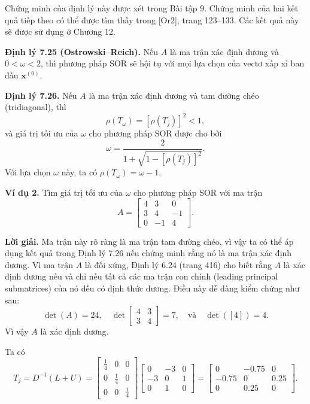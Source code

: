 Chứng minh của định lý này được xét trong Bài tập 9. 
Chứng minh của hai kết quả tiếp theo có thể được tìm thấy trong [Or2], trang 123–133. 
Các kết quả này sẽ được sử dụng ở Chương 12.

\textbf{Định lý 7.25 (Ostrowski–Reich).}  
Nếu \( A \) là ma trận xác định dương và \( 0 < \omega < 2 \), 
thì phương pháp SOR sẽ hội tụ với mọi lựa chọn của vectơ xấp xỉ ban đầu \( \mathbf{x}^{(0)} \).

\textbf{Định lý 7.26.}  
Nếu \( A \) là ma trận xác định dương và tam đường chéo (tridiagonal), thì 
\[
\rho(T_\omega) = [\rho(T_j)]^2 < 1,
\]
và giá trị tối ưu của \( \omega \) cho phương pháp SOR được cho bởi
\[
\omega = \frac{2}{1 + \sqrt{1 - [\rho(T_j)]^2}}.
\]
Với lựa chọn \( \omega \) này, ta có \( \rho(T_\omega) = \omega - 1. \)

\textbf{Ví dụ 2.}  
Tìm giá trị tối ưu của \( \omega \) cho phương pháp SOR với ma trận
\[
A = 
\begin{bmatrix}
4 & 3 & 0 \\
3 & 4 & -1 \\
0 & -1 & 4
\end{bmatrix}.
\]

\textbf{Lời giải.}  
Ma trận này rõ ràng là ma trận tam đường chéo, vì vậy ta có thể áp dụng kết quả trong Định lý 7.26 
nếu chứng minh rằng nó là ma trận xác định dương.  
Vì ma trận \( A \) là đối xứng, Định lý 6.24 (trang 416) cho biết rằng \( A \) là xác định dương 
nếu và chỉ nếu tất cả các ma trận con chính (leading principal submatrices) của nó đều có định thức dương.  
Điều này dễ dàng kiểm chứng như sau:
\[
\det(A) = 24, \quad 
\det\!\begin{bmatrix} 4 & 3 \\ 3 & 4 \end{bmatrix} = 7, 
\quad \text{và} \quad 
\det([4]) = 4.
\]
Vì vậy \( A \) là xác định dương.

Ta có
\[
T_j = D^{-1}(L + U) =
\begin{bmatrix}
\frac{1}{4} & 0 & 0 \\
0 & \frac{1}{4} & 0 \\
0 & 0 & \frac{1}{4}
\end{bmatrix}
\begin{bmatrix}
0 & -3 & 0 \\
-3 & 0 & 1 \\
0 & 1 & 0
\end{bmatrix}
=
\begin{bmatrix}
0 & -0.75 & 0 \\
-0.75 & 0 & 0.25 \\
0 & 0.25 & 0
\end{bmatrix}.
\]

